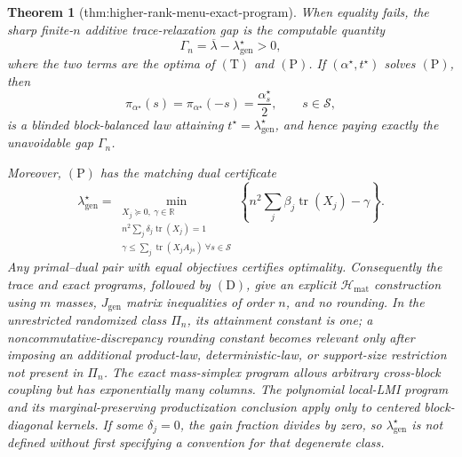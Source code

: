 \documentclass{article}
\newtheorem{theorem}{Theorem}
\begin{document}
\begin{theorem}[thm:higher-rank-menu-exact-program]
When equality fails, the sharp finite-\(n\) additive trace-relaxation gap is the computable quantity
\[
\Gamma_n=\overline\lambda-\lambda_{\mathrm{gen}}^\star>0,
\tag{G}
\]
where the two terms are the optima of \((\mathrm T)\) and \((\mathrm P)\). If \((\alpha^\star,t^\star)\) solves \((\mathrm P)\), then
\[
\pi_{\alpha^\star}(s)=\pi_{\alpha^\star}(-s)=\frac{\alpha_s^\star}{2},
\qquad s\in\mathscr S,
\tag{D}
\]
is a blinded block-balanced law attaining \(t^\star=\lambda_{\mathrm{gen}}^\star\), and hence paying exactly the unavoidable gap \(\Gamma_n\).

Moreover, \((\mathrm P)\) has the matching dual certificate
\[
\lambda_{\mathrm{gen}}^\star
=\min_{\substack{X_j\succeq0,\ \gamma\in\mathbb R\\
n^2\sum_j\delta_j\operatorname{tr}(X_j)=1\\
\gamma\le\sum_j\operatorname{tr}(X_jA_{js})\ \forall s\in\mathscr S}}
\left\{
n^2\sum_j\beta_j\operatorname{tr}(X_j)-\gamma
\right\}.
\tag{C}
\]
Any primal--dual pair with equal objectives certifies optimality. Consequently the trace and exact programs, followed by \((\mathrm D)\), give an explicit \(\mathcal H_{\mathrm{mat}}\) construction using \(m\) masses, \(J_{\mathrm{gen}}\) matrix inequalities of order \(n\), and no rounding. In the unrestricted randomized class \(\Pi_n\), its attainment constant is one; a noncommutative-discrepancy rounding constant becomes relevant only after imposing an additional product-law, deterministic-law, or support-size restriction not present in \(\Pi_n\). The exact mass-simplex program allows arbitrary cross-block coupling but has exponentially many columns. The polynomial local-LMI program and its marginal-preserving productization conclusion apply only to centered block-diagonal kernels. If some \(\delta_j=0\), the gain fraction divides by zero, so \(\lambda_{\mathrm{gen}}^\star\) is not defined without first specifying a convention for that degenerate class.
\end{theorem}
\end{document}
